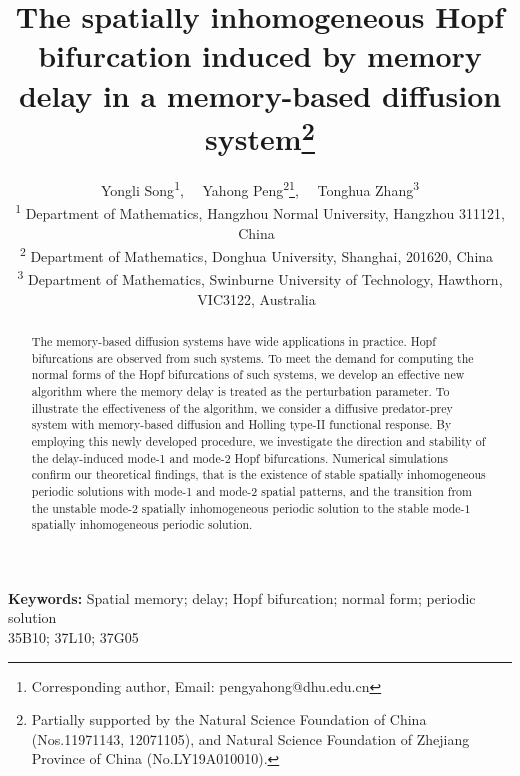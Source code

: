 \documentclass[11pt]{article}
\date{}
\theoremstyle{definition}
\theoremstyle{remark}
\numberwithin{equation}{section}
\begin{document}
\title{ \bf\large{The spatially inhomogeneous Hopf bifurcation induced by memory delay  in a memory-based diffusion system}\footnote{Partially supported by the Natural Science Foundation of  China (Nos.11971143, 12071105), and  Natural Science Foundation of Zhejiang Province of China  (No.LY19A010010).}}
\author{Yongli Song\textsuperscript{1}, \  \ Yahong Peng\textsuperscript{2}\footnote{Corresponding author, Email: pengyahong@dhu.edu.cn },  \  \ Tonghua Zhang\textsuperscript{3}  \\
{\small \textsuperscript{1} Department of Mathematics, Hangzhou Normal University, Hangzhou 311121, China\hfill {\ }}\\
{\small \textsuperscript{2} Department of Mathematics, Donghua University, Shanghai,
201620, China\hfill{\ }}\\
{\small \textsuperscript{3} Department of Mathematics, Swinburne University of Technology, Hawthorn, VIC3122,  Australia\hfill {\ }}\\
}
\maketitle
\begin{abstract}

The memory-based diffusion systems have wide applications in practice. Hopf bifurcations are observed from such systems. To meet the demand for computing the normal forms of the Hopf bifurcations of such systems, we develop an effective new algorithm where the memory delay is treated as the perturbation parameter. To illustrate the effectiveness of the algorithm, we consider a diffusive predator-prey system with memory-based diffusion and Holling type-II functional response. By employing this newly developed procedure, we   investigate the direction and stability of the delay-induced mode-1 and mode-2 Hopf bifurcations. Numerical simulations confirm our theoretical findings, that is  the existence of stable spatially inhomogeneous periodic solutions with mode-1 and mode-2 spatial patterns,  and the transition  from the  unstable mode-$2$ spatially inhomogeneous periodic solution to the stable mode-$1$ spatially inhomogeneous periodic solution.
\end{abstract}

\noindent
{\bf Keywords:} Spatial memory;  delay;   Hopf bifurcation;  normal form; periodic solution \\
  35B10;  37L10;  37G05
\end{document}

